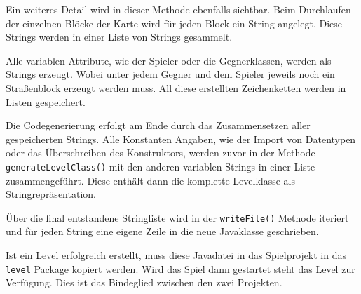 Ein weiteres Detail wird in dieser Methode ebenfalls sichtbar. Beim Durchlaufen der einzelnen Blöcke der Karte wird für jeden Block ein String angelegt. Diese Strings werden in einer Liste von Strings gesammelt.

Alle variablen Attribute, wie der Spieler oder die Gegnerklassen,  werden als Strings erzeugt. Wobei unter jedem Gegner und dem Spieler jeweils noch ein Straßenblock erzeugt werden muss. All diese erstellten Zeichenketten werden in Listen gespeichert. 

Die Codegenerierung erfolgt am Ende durch das Zusammensetzen aller gespeicherten Strings. Alle Konstanten Angaben, wie der Import von Datentypen oder das Überschreiben des Konstruktors, werden zuvor in der Methode \texttt{generateLevelClass()} mit den anderen variablen Strings in einer Liste zusammengeführt. Diese enthält dann die komplette Levelklasse als Stringrepräsentation.
 
Über die final entstandene Stringliste wird in der \texttt{writeFile()} Methode iteriert und für jeden String eine eigene Zeile in die neue Javaklasse geschrieben.

Ist ein Level erfolgreich erstellt, muss diese Javadatei in das Spielprojekt in das \texttt{level} Package kopiert werden. Wird das Spiel dann gestartet steht das Level zur Verfügung. Dies ist das Bindeglied zwischen den zwei Projekten.
